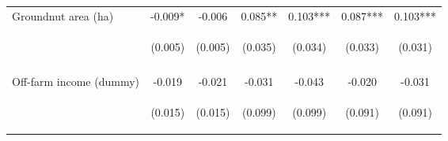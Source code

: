 \begin{center}
\begin{tabular}{lcccccc}
Groundnut area (ha) & -0.009* & -0.006 & 0.085** & 0.103*** & 0.087*** & 0.103*** \\
 & \begin{footnotesize}(0.005)\end{footnotesize} & \begin{footnotesize}(0.005)\end{footnotesize} & \begin{footnotesize}(0.035)\end{footnotesize} & \begin{footnotesize}(0.034)\end{footnotesize} & \begin{footnotesize}(0.033)\end{footnotesize} & \begin{footnotesize}(0.031)\end{footnotesize} \\
\vspace{4pt} & \begin{footnotesize}[0.073]\end{footnotesize} & \begin{footnotesize}[0.221]\end{footnotesize} & \begin{footnotesize}[0.016]\end{footnotesize} & \begin{footnotesize}[0.002]\end{footnotesize} & \begin{footnotesize}[0.008]\end{footnotesize} & \begin{footnotesize}[0.001]\end{footnotesize} \\
Off-farm income (dummy) & -0.019 & -0.021 & -0.031 & -0.043 & -0.020 & -0.031 \\
 & \begin{footnotesize}(0.015)\end{footnotesize} & \begin{footnotesize}(0.015)\end{footnotesize} & \begin{footnotesize}(0.099)\end{footnotesize} & \begin{footnotesize}(0.099)\end{footnotesize} & \begin{footnotesize}(0.091)\end{footnotesize} & \begin{footnotesize}(0.091)\end{footnotesize} \\

\end{tabular}
\end{center}
